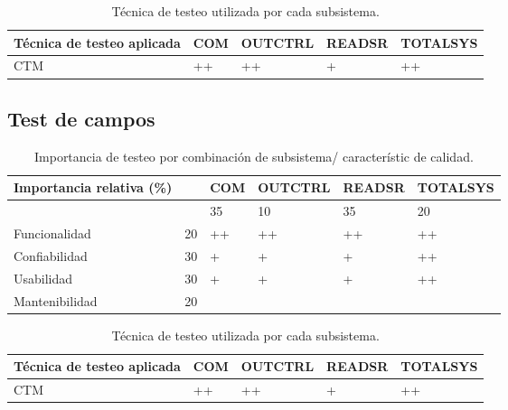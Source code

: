 \documentclass[12pt,a4paper, twosite]{article}
\begin{document}
\begin{table}[ht]
    \centering
    \begin{tabular}{|l|l|l|l|l|}\hline \hline
        Técnica de testeo aplicada & COM & OUTCTRL & READSR & TOTALSYS \\
        \hline
        CTM                        & ++  & ++      & +      & ++       \\
        \hline
    \end{tabular}
    \caption{Técnica de testeo utilizada por cada subsistema.}
\end{table}

\subsection{Test de campos}
\begin{table}[ht]
    \centering
    \begin{tabular}{|l|l|l|l|l|l|}\hline \hline
        Importancia relativa (\%) &    & COM & OUTCTRL & READSR & TOTALSYS \\
        \hline

                                  &    & 35  & 10      & 35     & 20       \\
        Funcionalidad             & 20 & ++  & ++      & ++     & ++       \\
        Confiabilidad             & 30 & +   & +       & +      & ++       \\
        Usabilidad                & 30 & +   & +       & +      & ++       \\
        Mantenibilidad            & 20 &     &         &        &          \\
        \hline
    \end{tabular}
    \caption{Importancia de testeo por combinación de subsistema/ característic
        de calidad.}
\end{table}

\begin{table}[ht]
    \centering
    \begin{tabular}{|l|l|l|l|l|}\hline \hline
        Técnica de testeo aplicada & COM & OUTCTRL & READSR & TOTALSYS \\
        \hline
        CTM                        & ++  & ++      & +      & ++       \\
        \hline
    \end{tabular}
    \caption{Técnica de testeo utilizada por cada subsistema.}
\end{table}
\end{document}
